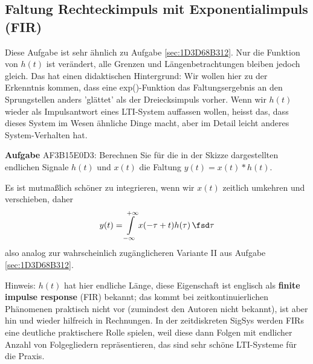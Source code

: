\clearpage
\subsection{Faltung Rechteckimpuls mit Exponentialimpuls (FIR)}
\label{sec:AF3B15E0D3}
\begin{Ziel}
Diese Aufgabe ist sehr ähnlich zu Aufgabe \ref{sec:1D3D68B312}.
Nur die Funktion von $h(t)$ ist verändert, alle Grenzen und
Längenbetrachtungen bleiben jedoch gleich. Das hat einen didaktischen
Hintergrund: Wir wollen hier zu der Erkenntnis kommen, dass eine exp()-Funktion
das Faltungsergebnis an den Sprungstellen anders 'glättet' als der Dreiecksimpuls
vorher.
Wenn wir $h(t)$ wieder als Impulsantwort eines LTI-System auffassen wollen,
heisst das, dass dieses System im Wesen ähnliche Dinge macht, aber im Detail
leicht anderes System-Verhalten hat.
\end{Ziel}
\textbf{Aufgabe} {\tiny AF3B15E0D3}: Berechnen Sie für die in der Skizze dargestellten
endlichen Signale $h(t)$ und $x(t)$ die Faltung $y(t)=x(t) \ast h(t)$.




\begin{Werkzeug}
Es ist mutmaßlich schöner zu integrieren, wenn wir $x(t)$ zeitlich umkehren und
verschieben, daher
\begin{equation}
y(t) = \int\limits_{-\infty}^{+\infty} x(-\tau+t) h(\tau) \, \fsd \tau
\end{equation}
also analog zur wahrscheinlich zugänglicheren Variante II aus Aufgabe
\ref{sec:1D3D68B312}.

Hinweis: $h(t)$ hat hier endliche Länge, diese Eigenschaft ist englisch als \textbf{finite impulse response} (FIR) bekannt; das kommt bei zeitkontinuierlichen Phänomenen praktisch nicht vor (zumindest den Autoren nicht bekannt), ist aber hin und wieder hilfreich in Rechnungen. In der zeitdiskreten SigSys werden FIRs eine deutliche praktischere Rolle spielen, weil diese dann Folgen mit endlicher Anzahl von Folgegliedern repräsentieren, das sind sehr schöne LTI-Systeme für die Praxis.
\end{Werkzeug}


